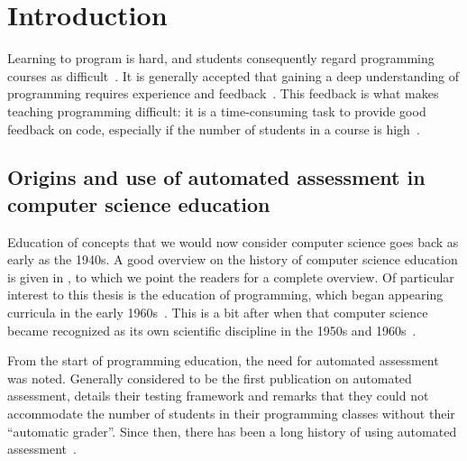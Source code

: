 \documentclass[./main]{subfiles}
\begin{document}
\chapter{Introduction}\label{ch:introduction}

Learning to program is hard, and students consequently regard programming courses as difficult~\autocite{robinsLearningTeachingProgramming2003,simoesNatureProgrammingExercises2020}.
It is generally accepted that gaining a deep understanding of programming requires experience and feedback~\autocite{gomesEnvironmentImproveProgramming2007}.
This feedback is what makes teaching programming difficult: it is a time-consuming task to provide good feedback on code, especially if the number of students in a course is high~\autocite{zavalaUseSemanticbasedAIG2018,staubitzRepositoryOpenAutogradable2017,queirosPexilProgrammingExercises2011,pirttinenCrowdsourcingProgrammingAssignments2018,gulwaniFeedbackGenerationPerformance2014,tangDatadrivenTestCase2016}.

\section{Origins and use of automated assessment in computer science education}\label{sec:automated-assessment-in-computer-science-education}

Education of concepts that we would now consider computer science goes back as early as the 1940s.
A good overview on the history of computer science education is given in \textcite{tedreChangingAimsComputing2018}, to which we point the readers for a complete overview.
Of particular interest to this thesis is the education of programming, which began appearing curricula in the early 1960s~\autocite{simonEmergenceComputingEducation2015}.
This is a bit after when that computer science became recognized as its own scientific discipline in the 1950s and 1960s~\autocite{hopcroftComputerScienceEmergence1987,atchisonComputerScienceNew1971,gornComputerInformationSciences1963,knuthComputerScienceIts1974,denningScienceComputerScience2013}.

From the start of programming education, the need for automated assessment was noted.
Generally considered to be the first publication on automated assessment, \textcite{hollingsworthAutomaticGradersProgramming1960} details their testing framework and remarks that they could not accommodate the number of students in their programming classes without their ``automatic grader''.
Since then, there has been a long history of using automated assessment~\autocite{ala-mutkaSurveyAutomatedAssessment2005,douceAutomaticTestbasedAssessment2005,ihantolaReviewRecentSystems2010,paivaAutomatedAssessmentComputer2022,combefisAutomatedCodeAssessment2022,nayakAutomatedAssessmentTools2022,messerAutomatedGradingFeedback2024}.
\end{document}
